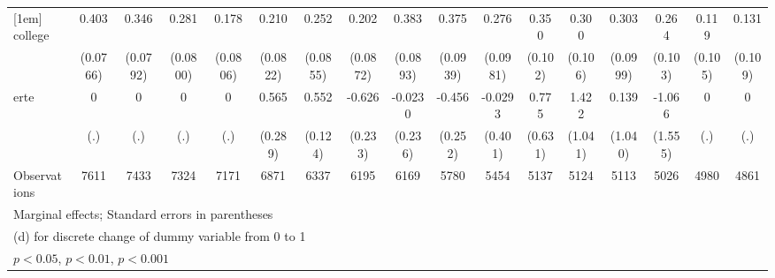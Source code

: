 {\begin{tabular}{l*{16}{c}}
[1em]
college             &       0.403\sym{***}&       0.346\sym{***}&       0.281\sym{***}&       0.178\sym{*}  &       0.210\sym{*}  &       0.252\sym{**} &       0.202\sym{*}  &       0.383\sym{***}&       0.375\sym{***}&       0.276\sym{**} &       0.350\sym{***}&       0.300\sym{**} &       0.303\sym{**} &       0.264\sym{*}  &       0.119         &       0.131         \\
                    &    (0.0766)         &    (0.0792)         &    (0.0800)         &    (0.0806)         &    (0.0822)         &    (0.0855)         &    (0.0872)         &    (0.0893)         &    (0.0939)         &    (0.0981)         &     (0.102)         &     (0.106)         &    (0.0999)         &     (0.103)         &     (0.105)         &     (0.109)         \\
[1em]
erte                &           0         &           0         &           0         &           0         &       0.565         &       0.552\sym{***}&      -0.626\sym{**} &     -0.0230         &      -0.456         &     -0.0293         &       0.775         &       1.422         &       0.139         &      -1.066         &           0         &           0         \\
                    &         (.)         &         (.)         &         (.)         &         (.)         &     (0.289)         &     (0.124)         &     (0.233)         &     (0.236)         &     (0.252)         &     (0.401)         &     (0.631)         &     (1.041)         &     (1.040)         &     (1.555)         &         (.)         &         (.)         \\
\hline
Observations        &        7611         &        7433         &        7324         &        7171         &        6871         &        6337         &        6195         &        6169         &        5780         &        5454         &        5137         &        5124         &        5113         &        5026         &        4980         &        4861         \\
\hline\hline
\multicolumn{17}{l}{\footnotesize Marginal effects; Standard errors in parentheses}\\
\multicolumn{17}{l}{\footnotesize  (d) for discrete change of dummy variable from 0 to 1}\\
\multicolumn{17}{l}{\footnotesize \sym{*} \(p<0.05\), \sym{**} \(p<0.01\), \sym{***} \(p<0.001\)}\\
\end{tabular}
}
